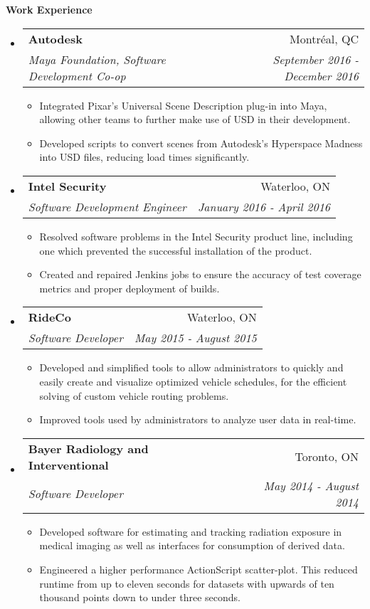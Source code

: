\documentclass[letterpaper,11pt]{article}
\makeatletter
\newcommand{\resitem}[1]{\item #1 \vspace{-2pt}}
\newcommand{\resheading}[1]{{\large \colorbox{mygrey}{\begin{minipage}{\textwidth}{\textbf{#1 \vphantom{p\^{E}}}}\end{minipage}}}}
\newcommand{\ressubheading}[4]{
\begin{tabular*}{7.0in}{l@{\extracolsep{\fill}}r}
		\textbf{#1} & #2 \\
		\textit{#3} & \textit{#4} \\
\end{tabular*}\vspace{-6pt}}
\makeatother
\begin{document}
\resheading{Work Experience}
\begin{itemize}
\item \ressubheading{Autodesk}{Montr\'eal, QC}{Maya Foundation, Software Development Co-op}{September 2016 - December 2016}
	\begin{itemize}
		\resitem{Integrated Pixar's Universal Scene Description plug-in into Maya, allowing other teams to further make use of USD in their development.}
		\resitem{Developed scripts to convert scenes from Autodesk's Hyperspace Madness into USD files, reducing load times significantly.}
	\end{itemize}
\item \ressubheading{Intel Security}{Waterloo, ON}{Software Development Engineer}{January 2016 - April 2016}
	\begin{itemize}
		\resitem{Resolved software problems in the Intel Security product line, including one which prevented the successful installation of the product.}
		\resitem{Created and repaired Jenkins jobs to ensure the accuracy of test coverage metrics and proper deployment of builds.}
	\end{itemize}
\item \ressubheading{RideCo}{Waterloo, ON}{Software Developer}{May 2015 - August 2015}
	\begin{itemize}
		\resitem{Developed and simplified tools to allow administrators to quickly and easily create and visualize optimized vehicle schedules, for the efficient solving of custom vehicle routing problems.}
		\resitem{Improved tools used by administrators to analyze user data in real-time.}
	\end{itemize}
\item \ressubheading{Bayer Radiology and Interventional}{Toronto, ON}{Software Developer}{May 2014 - August 2014}
	\begin{itemize}
		\resitem{Developed software for estimating and tracking radiation exposure in medical imaging as well as interfaces for consumption of derived data. }
		\resitem{Engineered a higher performance ActionScript scatter-plot. This reduced runtime from up to eleven seconds for datasets with upwards of ten thousand points down to under three seconds.}
	\end{itemize}
\end{itemize}
\end{document}
